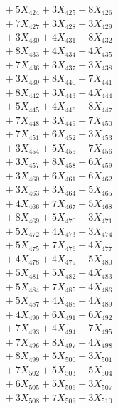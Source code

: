 \documentclass[a4paper,10pt]{article}
\begin{document}
{\begin{align}
&\;  + 5 X_{424} + 3 X_{425} + 8 X_{426} \\[0.3ex]
&\;  + 7 X_{427} + 3 X_{428} + 3 X_{429} \\[0.5ex]\allowbreak
&\;  + 3 X_{430} + 4 X_{431} + 8 X_{432} \\[0.3ex]
&\;  + 8 X_{433} + 4 X_{434} + 4 X_{435} \\[0.3ex]
&\;  + 7 X_{436} + 3 X_{437} + 3 X_{438} \\[0.3ex]
&\;  + 3 X_{439} + 8 X_{440} + 7 X_{441} \\[0.3ex]
&\;  + 8 X_{442} + 3 X_{443} + 4 X_{444} \\[0.3ex]
&\;  + 5 X_{445} + 4 X_{446} + 8 X_{447} \\[0.3ex]
&\;  + 7 X_{448} + 3 X_{449} + 7 X_{450} \\[0.3ex]
&\;  + 7 X_{451} + 6 X_{452} + 3 X_{453} \\[0.3ex]
&\;  + 3 X_{454} + 5 X_{455} + 7 X_{456} \\[0.3ex]
&\;  + 3 X_{457} + 8 X_{458} + 6 X_{459} \\[0.5ex]\allowbreak
&\;  + 3 X_{460} + 6 X_{461} + 6 X_{462} \\[0.3ex]
&\;  + 3 X_{463} + 3 X_{464} + 5 X_{465} \\[0.3ex]
&\;  + 4 X_{466} + 7 X_{467} + 5 X_{468} \\[0.3ex]
&\;  + 8 X_{469} + 5 X_{470} + 3 X_{471} \\[0.3ex]
&\;  + 5 X_{472} + 4 X_{473} + 3 X_{474} \\[0.3ex]
&\;  + 5 X_{475} + 7 X_{476} + 4 X_{477} \\[0.3ex]
&\;  + 4 X_{478} + 4 X_{479} + 5 X_{480} \\[0.3ex]
&\;  + 5 X_{481} + 5 X_{482} + 4 X_{483} \\[0.3ex]
&\;  + 5 X_{484} + 7 X_{485} + 4 X_{486} \\[0.3ex]
&\;  + 5 X_{487} + 4 X_{488} + 4 X_{489} \\[0.5ex]\allowbreak
&\;  + 4 X_{490} + 6 X_{491} + 6 X_{492} \\[0.3ex]
&\;  + 7 X_{493} + 4 X_{494} + 7 X_{495} \\[0.3ex]
&\;  + 7 X_{496} + 8 X_{497} + 4 X_{498} \\[0.3ex]
&\;  + 8 X_{499} + 5 X_{500} + 3 X_{501} \\[0.3ex]
&\;  + 7 X_{502} + 5 X_{503} + 5 X_{504} \\[0.3ex]
&\;  + 6 X_{505} + 5 X_{506} + 3 X_{507} \\[0.3ex]
&\;  + 3 X_{508} + 7 X_{509} + 3 X_{510} \\[0.3ex]

\end{align}}
\end{document}
